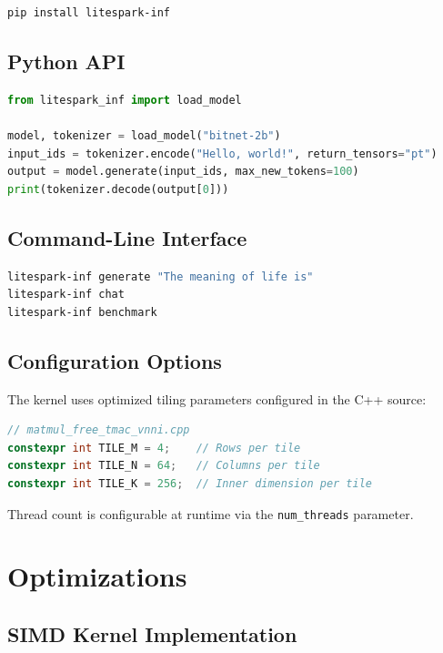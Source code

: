 \documentclass[11pt,a4paper]{article}
\begin{document}
\begin{lstlisting}[language=bash]
pip install litespark-inf
\end{lstlisting}

\subsection{Python API}

\begin{lstlisting}[language=Python]
from litespark_inf import load_model

model, tokenizer = load_model("bitnet-2b")
input_ids = tokenizer.encode("Hello, world!", return_tensors="pt")
output = model.generate(input_ids, max_new_tokens=100)
print(tokenizer.decode(output[0]))
\end{lstlisting}

\subsection{Command-Line Interface}

\begin{lstlisting}[language=bash]
litespark-inf generate "The meaning of life is"
litespark-inf chat
litespark-inf benchmark
\end{lstlisting}

\subsection{Configuration Options}

The kernel uses optimized tiling parameters configured in the C++ source:

\begin{lstlisting}[language=C++]
// matmul_free_tmac_vnni.cpp
constexpr int TILE_M = 4;    // Rows per tile
constexpr int TILE_N = 64;   // Columns per tile
constexpr int TILE_K = 256;  // Inner dimension per tile
\end{lstlisting}

Thread count is configurable at runtime via the \texttt{num\_threads} parameter.

\section{Optimizations}

\subsection{SIMD Kernel Implementation}
\end{document}
